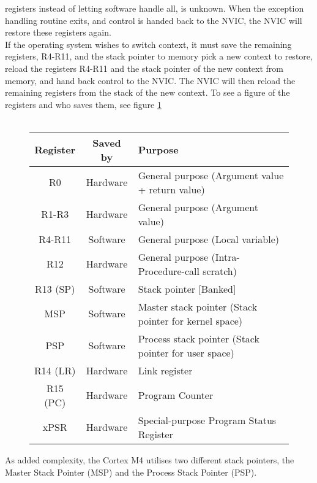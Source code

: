 registers instead of letting software handle all, is unknown. 
When the exception handling routine exits, and control is handed back to the NVIC,
the NVIC will restore these registers again.\\
If the operating system wishes to switch context, it must save the remaining registers, R4-R11, and the stack pointer to memory
pick a new context to restore, reload the registers R4-R11 and the stack pointer of the new context from memory,
and hand back control to the NVIC. The NVIC will then reload the remaining registers from the stack of the new context. To see a figure of the registers and who saves them, see figure \ref{tab:registers}\\\\
\begin{figure}[H]
	\centering
	\begin{tabular}{|c|c|p{9.5cm}|}
		\hline
		Register	&	Saved by	&	Purpose\\
		\hline
		R0			&	Hardware	&	General purpose (Argument value + return value)\\
		\hline
		R1-R3		&	Hardware	&	General purpose (Argument value)\\
		\hline
		R4-R11		&	Software	&	General purpose (Local variable)\\
		\hline
		R12			&	Hardware	&	General purpose (Intra-Procedure-call scratch)\\
		\hline
		R13 (SP)	&	Software	&	Stack pointer [Banked]\\
		MSP			&	Software	&	Master stack pointer (Stack pointer for kernel space)\\
		PSP			&	Software	&	Process stack pointer (Stack pointer for user space)\\
		\hline
		R14 (LR)	&	Hardware	&	Link register\\
		\hline
		R15 (PC)	&	Hardware	&	Program Counter\\
		\hline
		xPSR		&	Hardware	& 	Special-purpose Program Status Register\\
		\hline
	\end{tabular}
	\label{tab:registers}
\end{figure}
As added complexity, the Cortex M4 utilises two different stack pointers, the Master Stack Pointer (MSP) and the Process Stack Pointer (PSP).
